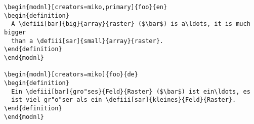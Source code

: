 \documentclass{bluenote}
\begin{document}
\begin{lstlisting}[label=lst:newmods,caption=Definiendum Markup in Language Bindings]
\begin{modnl}[creators=miko,primary]{foo}{en}
\begin{definition}
  A \defiii[bar]{big}{array}{raster} ($\bar$) is a\ldots, it is much bigger
  than a \defiii[sar]{small}{array}{raster}. 
\end{definition}
\end{modnl}

\begin{modnl}[creators=miko]{foo}{de}
\begin{definition}
  Ein \defiii[bar]{gro"ses}{Feld}{Raster} ($\bar$) ist ein\ldots, es
  ist viel gr"o"ser als ein \defiii[sar]{kleines}{Feld}{Raster}. 
\end{definition}
\end{modnl}
\end{lstlisting}
\end{document}
